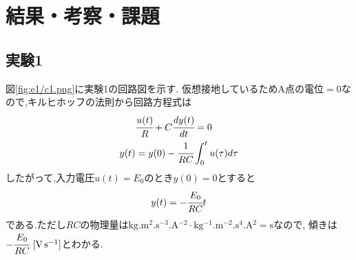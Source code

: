 \section{結果・考察・課題}
\subsection{実験1}
図\ref{fig:e1/c1.png}に実験1の回路図を示す\cite{rikougaku}.
仮想接地しているため$\mathrm{A}点の電位=0$なので,キルヒホッフの法則から回路方程式は
\begin{align}
  \label{equ:c1}
  &\cfrac{u(t)}{R}+C\cfrac{dy(t)}{dt}=0\\
  y(t)&=y(0)-\cfrac{1}{RC}\int^t_0u(\tau)d\tau
\end{align}
したがって,入力電圧$u(t)=E_0$のとき$y(0)=0$とすると
\begin{align}
  \label{equ:c1_y(t)}
  y(t)=-\cfrac{E_0}{RC}t
\end{align}
である.ただし$RC$の物理量は$\si{\kilo\gram.\metre^{2}.\second^{-3}.\ampere^{-2}}\cdot\si{\kilo\gram^{-1}.\metre^{-2}.\second^{4}.\ampere^{2}}=\si{\second}$なので,
傾きは$-\cfrac{E_0}{RC}~[\si{\volt.\second^{-1}}]$とわかる.

